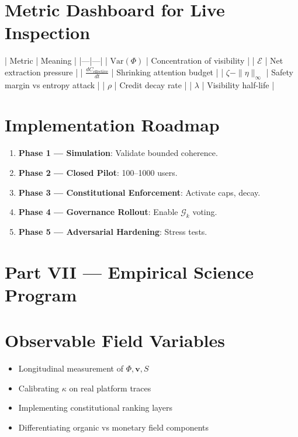 \documentclass[11pt,a4paper]{article}
\theoremstyle{plain}
\theoremstyle{definition}
\theoremstyle{remark}
\newcommand{\vvec}{\mathbf{v}}
\newcommand{\Entropy}{S}
\begin{document}
\section{Metric Dashboard for Live Inspection}

| Metric | Meaning |
|---|---|
| $\mathrm{Var}(\Phi)$ | Concentration of visibility |
| $\mathcal{E}$ | Net extraction pressure |
| $\frac{dC_{\text{effective}}}{dt}$ | Shrinking attention budget |
| $\zeta - \|\eta\|_\infty$ | Safety margin vs entropy attack |
| $\rho$ | Credit decay rate |
| $\lambda$ | Visibility half-life |

\section{Implementation Roadmap}

\begin{enumerate}
  \item \textbf{Phase 1 — Simulation}: Validate bounded coherence.
  \item \textbf{Phase 2 — Closed Pilot}: 100–1000 users.
  \item \textbf{Phase 3 — Constitutional Enforcement}: Activate caps, decay.
  \item \textbf{Phase 4 — Governance Rollout}: Enable $\mathcal{G}_k$ voting.
  \item \textbf{Phase 5 — Adversarial Hardening}: Stress tests.
\end{enumerate}

\newpage

\section*{Part VII — Empirical Science Program}

\section{Observable Field Variables}

\begin{itemize}
  \item Longitudinal measurement of $\Phi,\vvec,\Entropy$
  \item Calibrating $\kappa$ on real platform traces
  \item Implementing constitutional ranking layers
  \item Differentiating organic vs monetary field components
\end{itemize}
\end{document}
